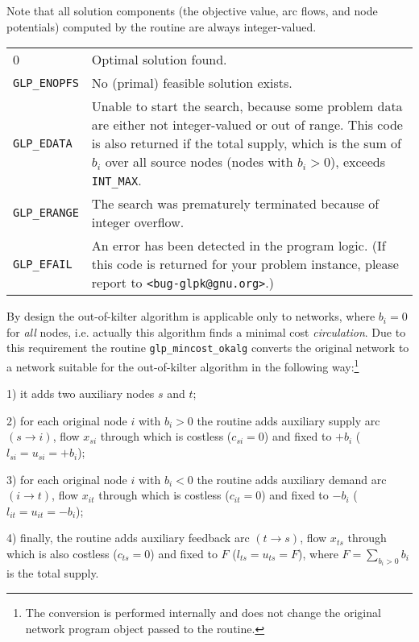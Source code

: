 \documentclass[11pt]{report}
\makeatletter
\def\para#1{\noindent{\bf#1}}
\def\returns{\para{Returns}}
\newenvironment{retlist}
{  \def\arraystretch{1.5}
   \noindent
   \begin{tabular}{@{}p{1in}@{}p{5.5in}@{}}
}
{\end{tabular}}
\makeatother
\begin{document}
\newpage

Note that all solution components (the objective value, arc flows, and
node potentials) computed by the routine are always integer-valued.

\returns

\begin{retlist}
0 & Optimal solution found.\\

\verb|GLP_ENOPFS| & No (primal) feasible solution exists.\\

\verb|GLP_EDATA| & Unable to start the search, because some problem
data are either not integer-valued or out of range. This code is also
returned if the total supply, which is the sum of $b_i$ over all source
nodes (nodes with $b_i>0$), exceeds \verb|INT_MAX|.\\

\verb|GLP_ERANGE| & The search was prematurely terminated because of
integer overflow.\\

\verb|GLP_EFAIL| & An error has been detected in the program logic.
(If this code is returned for your problem instance, please report to
\verb|<bug-glpk@gnu.org>|.)\\
\end{retlist}

\para{Comments}

By design the out-of-kilter algorithm is applicable only to networks,
where $b_i=0$ for {\it all} nodes, i.e. actually this algorithm finds a
minimal cost {\it circulation}. Due to this requirement the routine
\verb|glp_mincost_okalg| converts the original network to a network
suitable for the out-of-kilter algorithm in the following
way:\footnote{The conversion is performed internally and does not change
the original network program object passed to the routine.}

1) it adds two auxiliary nodes $s$ and $t$;

2) for each original node $i$ with $b_i>0$ the routine adds auxiliary
supply arc $(s\rightarrow i)$, flow $x_{si}$ through which is costless
($c_{si}=0$) and fixed to $+b_i$ ($l_{si}=u_{si}=+b_i$);

3) for each original node $i$ with $b_i<0$ the routine adds auxiliary
demand arc $(i\rightarrow t)$, flow $x_{it}$ through which is costless
($c_{it}=0$) and fixed to $-b_i$ ($l_{it}=u_{it}=-b_i$);

4) finally, the routine adds auxiliary feedback arc $(t\rightarrow s)$,
flow $x_{ts}$ through which is also costless ($c_{ts}=0$) and fixed to
$F$ ($l_{ts}=u_{ts}=F$), where $\displaystyle F=\sum_{b_i>0}b_i$ is the
total supply.
\end{document}
